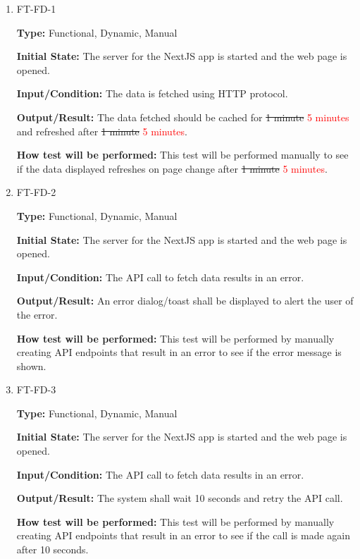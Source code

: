 \documentclass[12pt, titlepage]{article}
\begin{document}
\begin{enumerate}

\item{FT-FD-1}

\textbf{Type:} Functional, Dynamic, Manual
                    
\textbf{Initial State:} The server for the NextJS app is started and the web page is opened.
                    
\textbf{Input/Condition:} The data is fetched using HTTP protocol.
                    
\textbf{Output/Result:} The data fetched should be cached for \sout{1 minute} \textcolor{red}{5 minutes} and refreshed after \sout{1 minute} \textcolor{red}{5 minutes}.
                    
\textbf{How test will be performed:} This test will be performed manually to see if the data displayed refreshes on page change after \sout{1 minute} \textcolor{red}{5 minutes}.


\item{FT-FD-2}

\textbf{Type:} Functional, Dynamic, Manual
                    
\textbf{Initial State:} The server for the NextJS app is started and the web page is opened.
                    
\textbf{Input/Condition:} The API call to fetch data results in an error.
                    
\textbf{Output/Result:} An error dialog/toast shall be displayed to alert the user of the error.
                    
\textbf{How test will be performed:} This test will be performed by manually creating API endpoints that result in an error to see if the error message is shown.

\item{FT-FD-3}

\textbf{Type:} Functional, Dynamic, Manual
                    
\textbf{Initial State:} The server for the NextJS app is started and the web page is opened.
                    
\textbf{Input/Condition:} The API call to fetch data results in an error.
                    
\textbf{Output/Result:} The system shall wait 10 seconds and retry the API call.
                    
\textbf{How test will be performed:} This test will be performed by manually creating API endpoints that result in an error to see if the call is made again after 10 seconds.


\end{enumerate}
\end{document}
